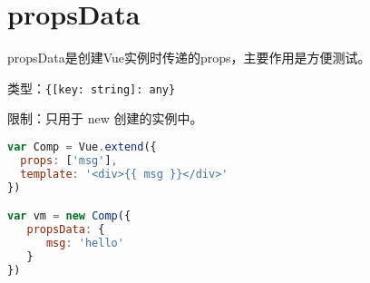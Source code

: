 \begin{lstlisting}[language=JavaScript]

\end{lstlisting}




\begin{lstlisting}[language=JavaScript]

\end{lstlisting}




\begin{lstlisting}[language=JavaScript]

\end{lstlisting}




\begin{lstlisting}[language=JavaScript]

\end{lstlisting}





\section{propsData}

propsData是创建Vue实例时传递的props，主要作用是方便测试。

\begin{compactitem}
\item 类型：\texttt{\{[key: string]: any\}}
\item 限制：只用于 new 创建的实例中。
\end{compactitem}





\begin{lstlisting}[language=JavaScript]
var Comp = Vue.extend({
  props: ['msg'],
  template: '<div>{{ msg }}</div>'
})

var vm = new Comp({
   propsData: {
      msg: 'hello'
   }
})
\end{lstlisting}




\begin{lstlisting}[language=JavaScript]

\end{lstlisting}




\begin{lstlisting}[language=JavaScript]

\end{lstlisting}




